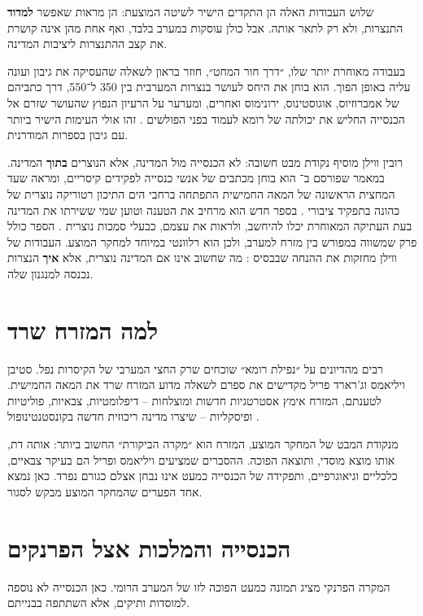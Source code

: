 שלוש העבודות האלה הן התקדים הישיר לשיטה המוצעת: הן מראות שאפשר \textbf{למדוד} התנצרות, ולא רק לתאר אותה. אבל כולן עוסקות במערב בלבד, ואף אחת מהן אינה קושרת את קצב ההתנצרות ליציבות המדינה.

בעבודה מאוחרת יותר שלו, ״דרך חור המחט״, חוזר בראון לשאלה שהעסיקה את גיבון ועונה עליה באופן הפוך. הוא בוחן את היחס לעושר בנצרות המערבית בין 350 ל־550, דרך כתביהם של אמברוזיוס, אוגוסטינוס, ירונימוס ואחרים, ומערער על הרעיון הנפוץ שהעושר שזרם אל הכנסייה החליש את יכולתה של רומא לעמוד בפני הפולשים \cite{brown2012needle}. זהו אולי העימות הישיר ביותר עם גיבון בספרות המודרנית.

רובין ווילן מוסיף נקודת מבט חשובה: לא הכנסייה מול המדינה, אלא הנוצרים \textbf{בתוך} המדינה. במאמר שפורסם ב־ הוא בוחן מכתבים של אנשי כנסייה לפקידים קיסריים, ומראה שעד המחצית הראשונה של המאה החמישית התפתחה ברחבי הים התיכון רטוריקה נוצרית של כהונה בתפקיד ציבורי \cite{whelan2018mirrors}. בספר חדש הוא מרחיב את הטענה וטוען שמי ששירתו את המדינה בעת העתיקה המאוחרת יכלו להיחשב, ולראות את עצמם, כבעלי סמכות נוצרית \cite{whelan2026serving}. הספר כולל פרק שמשווה במפורש בין מזרח למערב, ולכן הוא רלוונטי במיוחד למחקר המוצע. העבודות של ווילן מחזקות את ההנחה שבבסיס : מה שחשוב אינו אם המדינה נוצרית, אלא \textbf{איך} הנצרות נכנסה למנגנון שלה.

\section{למה המזרח שרד}
\label{sec:lit-east}

רבים מהדיונים על ״נפילת רומא״ שוכחים שרק החצי המערבי של הקיסרות נפל. סטיבן ויליאמס וג'רארד פריל מקדישים את ספרם לשאלה מדוע המזרח שרד את המאה החמישית. לטענתם, המזרח אימץ אסטרטגיות חדשות ומוצלחות – דיפלומטיות, צבאיות, פוליטיות ופיסקליות – שיצרו מדינה ריכוזית חדשה בקונסטנטינופול \cite{williams1999rome}.

מנקודת המבט של המחקר המוצע, המזרח הוא ״מקרה הביקורת״ החשוב ביותר: אותה דת, אותו מוצא מוסדי, ותוצאה הפוכה. ההסברים שמציעים ויליאמס ופריל הם בעיקר צבאיים, כלכליים וגיאוגרפיים, ותפקידה של הכנסייה כמעט אינו נבחן אצלם כגורם נפרד. כאן נמצא אחד הפערים שהמחקר המוצע מבקש לסגור.

\section{הכנסייה והמלכות אצל הפרנקים}
\label{sec:lit-franks}

המקרה הפרנקי מציג תמונה כמעט הפוכה לזו של המערב הרומי. כאן הכנסייה לא נוספה למוסדות ותיקים, אלא השתתפה בבנייתם.

